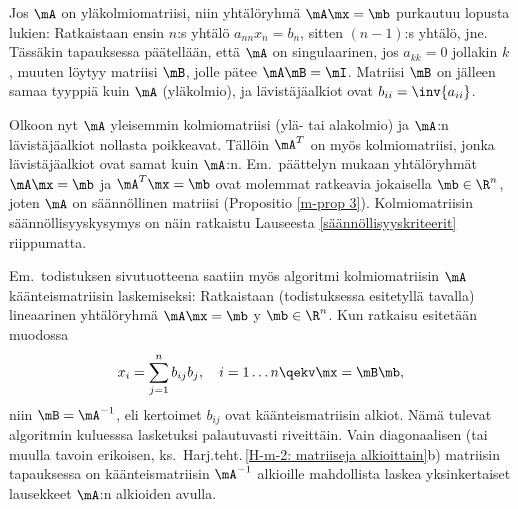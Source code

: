Jos $\mA$ on yläkolmiomatriisi, niin yhtälöryhmä $\mA\mx=\mb$ purkautuu lopusta lukien:
Ratkaistaan ensin $n$:s yhtälö $a_{nn}x_n=b_n$, sitten $(n-1)$:s yhtälö, jne. Tässäkin
tapauksessa päätellään, että $\mA$ on singulaarinen, jos $a_{kk} = 0$ jollakin $k$, muuten
löytyy matriisi $\mB$, jolle pätee $\mA\mB=\mI$. Matriisi $\mB$ on jälleen samaa tyyppiä kuin
$\mA$ (yläkolmio), ja lävistäjäalkiot ovat $b_{ii}=\inv{a_{ii}}$.

Olkoon nyt $\mA$ yleisemmin kolmiomatriisi (ylä- tai alakolmio) ja $\mA$:n lävistäjäalkiot
nollasta poikkeavat. Tällöin $\mA^T$ on myös kolmiomatriisi, jonka lävistäjäalkiot ovat samat 
kuin $\mA$:n. Em.\ päättelyn mukaan yhtälöryhmät $\mA\mx=\mb$ ja $\mA^T\mx=\mb$ ovat
molemmat ratkeavia jokaisella $\mb\in\R^n$, joten $\mA$ on säännöllinen matriisi
(Propositio \ref{m-prop 3}). Kolmiomatriisin säännöllisyyskysymys on näin ratkaistu Lauseesta
\ref{säännöllisyyskriteerit} riippumatta. \loppu

Em.\ todistuksen sivutuotteena saatiin myös algoritmi kolmiomatriisin $\mA$ käänteismatriisin
laskemiseksi: Ratkaistaan (todistuksessa esitetyllä tavalla) lineaarinen yhtälöryhmä
$\mA\mx=\mb$ y $\mb\in\R^n$. Kun ratkaisu esitetään muodossa
\[
x_i=\sum_{j=1}^n b_{ij}b_j, \quad i=1 \ldots n \qekv \mx=\mB\mb,
\]
niin $\mB=\mA^{-1}$, eli kertoimet $b_{ij}$ ovat käänteismatriisin alkiot. Nämä tulevat
algoritmin kuluesssa lasketuksi palautuvasti riveittäin. Vain diagonaalisen (tai muulla tavoin
erikoisen, ks.\ Harj.teht.\,\ref{H-m-2: matriiseja alkioittain}b) matriisin tapauksessa on
käänteismatriisin $\mA^{-1}$ alkioille mahdollista laskea yksinkertaiset lausekkeet $\mA$:n
alkioiden avulla.

